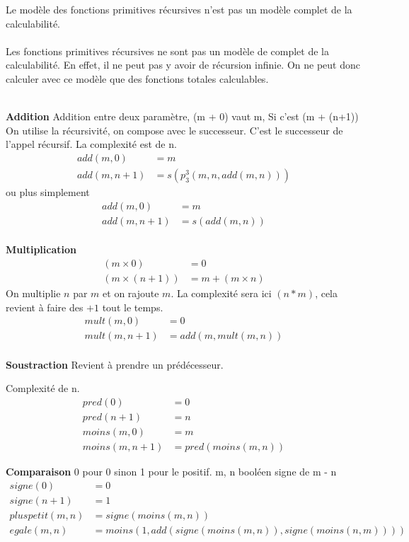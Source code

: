 \begin{myprop}
	Le modèle des fonctions primitives récursives n'est pas un modèle complet de la calculabilité.
\end{myprop}
\paragraph{} Les fonctions primitives récursives ne sont pas un modèle de complet de
	la calculabilité. En effet, il ne peut pas y avoir de récursion
	infinie. On ne peut donc calculer avec ce modèle que des fonctions
	totales calculables.

\begin{myexem}\ \\
	\textbf{Addition}
	Addition entre deux paramètre, (m + 0) vaut m,
	Si c’est (m + (n+1)) On utilise la récursivité, on compose avec le successeur. C’est le successeur de l’appel récursif.
	La complexité est de n.
	\begin{align*}
		add (m, 0) &= m \\
		add (m, n+1) &= s (p^3_3(m, n, add (m, n)))
	\end{align*}
	ou plus simplement
	\begin{align*}
		add (m, 0) &= m \\
		add (m, n+1) &= s (add (m, n))
	\end{align*}
	\\
	\textbf{Multiplication}
	\begin{align*}
	(m\times 0) &= 0\\
	(m \times (n+1)) &= m + (m\times n)
	\end{align*}
	On multiplie $n$ par $m$ et on rajoute $m$. La complexité sera ici $(n*m)$, cela revient à faire des $+1$ tout le temps.
	\begin{align*}
	mult (m, 0) &= 0 \\
	mult (m, n+1) &= add (m, mult(m, n))
	\end{align*}
	\\
	\textbf{Soustraction} Revient à prendre un prédécesseur.

	Complexité de n. 
	\begin{align}
	pred (0) &= 0 \\
	pred (n+1) &= n \\
	moins (m, 0) &= m \\
	moins (m, n+1) &= pred (moins (m, n))
	\end{align}

	\textbf{Comparaison} 0 pour 0 sinon 1 pour le positif.
	m, n booléen signe de m - n
	\begin{align*}
	signe (0) &= 0 \\
	signe (n+1) &= 1 \\
	pluspetit (m, n) &= signe(moins(m, n)) \\
	egale (m, n) &= moins (1, add(signe (moins (m, n)), signe (moins (n, m))))
	\end{align*}
\end{myexem}


